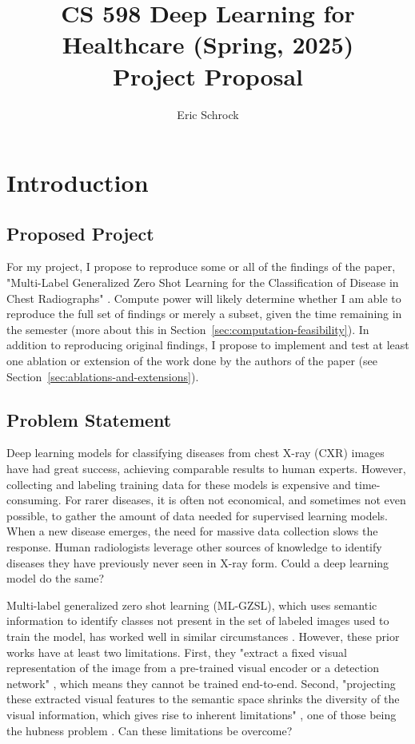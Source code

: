 \documentclass[letterpaper]{article} %
\title{CS 598 Deep Learning for Healthcare (Spring, 2025)\\Project Proposal}
\author {Eric Schrock}
\begin{document}
\maketitle

\section{Introduction}

\subsection{Proposed Project}

For my project, I propose to reproduce some or all of the findings of the paper, "Multi-Label Generalized Zero Shot Learning for the Classification of Disease in Chest Radiographs" \cite{hayat2021multilabel}. Compute power will likely determine whether I am able to reproduce the full set of findings or merely a subset, given the time remaining in the semester (more about this in Section~\ref{sec:computation-feasibility}). In addition to reproducing original findings, I propose to implement and test at least one ablation or extension of the work done by the authors of the paper (see Section~\ref{sec:ablations-and-extensions}).

\subsection{Problem Statement}

Deep learning models for classifying diseases from chest X-ray (CXR) images have had great success, achieving comparable results to human experts. However, collecting and labeling training data for these models is expensive and time-consuming. For rarer diseases, it is often not economical, and sometimes not even possible, to gather the amount of data needed for supervised learning models. When a new disease emerges, the need for massive data collection slows the response. Human radiologists leverage other sources of knowledge to identify diseases they have previously never seen in X-ray form. Could a deep learning model do the same?

Multi-label generalized zero shot learning (ML-GZSL), which uses semantic information to identify classes not present in the set of labeled images used to train the model, has worked well in similar circumstances \cite{10.1109/TPAMI.2012.256, 10.1109/TMM.2019.2924511, 9157745}. However, these prior works have at least two limitations. First, they "extract a fixed visual representation of the image from a pre-trained visual encoder or a detection network" \cite{hayat2021multilabel}, which means they cannot be trained end-to-end. Second, "projecting these extracted visual features to the semantic space shrinks the diversity of the visual information, which gives rise to inherent limitations" \cite{hayat2021multilabel}, one of those being the hubness problem \cite{dinu2015improvingzeroshotlearningmitigating}. Can these limitations be overcome?
\end{document}
